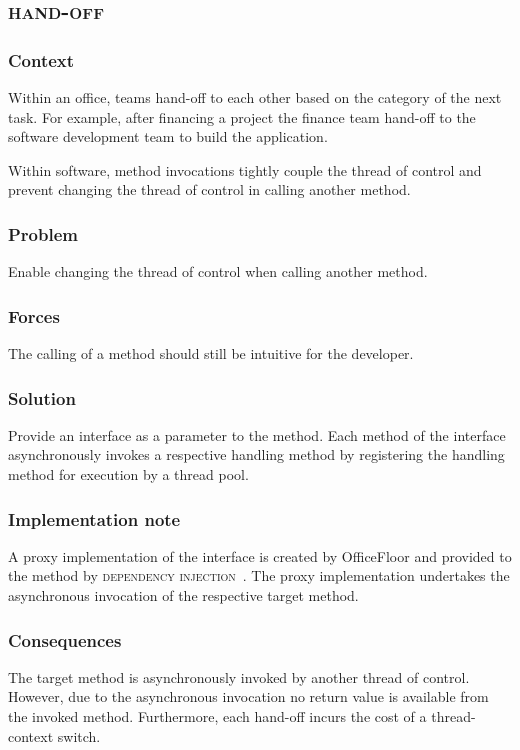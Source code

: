 \documentclass[prodmode]{style/acmlarge}
\begin{document}
\subsection{\textsc{\textbf{hand-off}}}

\subsubsection*{Context} Within an office, teams hand-off to each other based on
the category of the next task.  For example, after financing a project the
finance team hand-off to the software development team to build the application.

Within software, method invocations tightly couple the thread of control and
prevent changing the thread of control in calling another method.

\subsubsection*{\textbf{Problem}} Enable changing the thread of control when calling
another method.

\subsubsection*{Forces} The calling of a method should still be intuitive for
the developer.

\subsubsection*{\textbf{Solution}}  Provide an interface as a parameter to the
method.  Each method of the interface asynchronously invokes a respective
handling method by registering the handling method for execution by a thread
pool.

\subsubsection*{Implementation note} A proxy implementation of the interface is
created by OfficeFloor and provided to the method by \textsc{dependency
injection}~\cite{ioc}.  The proxy implementation undertakes the asynchronous
invocation of the respective target method.

\subsubsection*{Consequences} The target method is asynchronously invoked by
another thread of control.  However, due to the asynchronous invocation no
return value is available from the invoked method.  Furthermore, each hand-off
incurs the cost of a thread-context switch.
\end{document}
